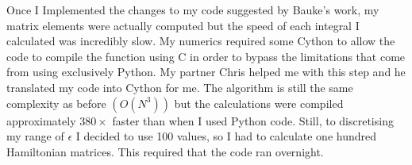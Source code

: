 \documentclass[10pt, a4paper, singlespacing, headsepline]{report}
\begin{document}
Once I Implemented the changes to my code suggested by Bauke's work, my matrix elements were actually computed but the speed of each integral I calculated was incredibly slow. My numerics required some Cython to allow the code to compile the function using C in order to bypass the limitations that come from using exclusively Python. My partner Chris helped me with this step and he translated my code into Cython for me. The algorithm is still the same complexity as before $(O(N^3))$ but the calculations were compiled approximately $380\times$ faster than when I used Python code. Still, to discretising my range of $\epsilon$ I decided to use 100 values, so I had to calculate one hundred  Hamiltonian matrices. This required that the code ran overnight.
\end{document}
